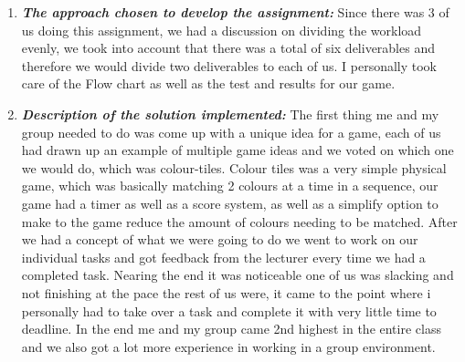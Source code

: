 \documentclass[12pt]{article}
\begin{document}
\begin{enumerate}
\item \textbf{\emph{The approach chosen to develop the assignment: }} Since there was 3 of us doing this assignment, we had a discussion on dividing the workload evenly, we took into account that there was a total of six deliverables and therefore we would divide two deliverables to each of us. I personally took care of the Flow chart as well as the test and results for our game.


\newpage

\item \textbf{\emph{Description of the solution implemented: }} The first thing me and my group needed to do was come up with a unique idea for a game, each of us had drawn up an example of multiple game ideas and we voted on which one we would do, which was colour-tiles. Colour tiles was a very simple physical game, which was basically matching 2 colours at a time in a sequence, our game had a timer as well as a score system, as well as a simplify option to make to the game reduce the amount of colours needing to be matched. After we had a concept of what we were going to do we went to work on our individual tasks and got feedback from the lecturer every time we had a completed task. Nearing the end it was noticeable one of us was slacking and not finishing at the pace the rest of us were, it came to the point where i personally had to take over a task and complete it with very little time to deadline. In the end me and my group came 2nd highest in the entire class and we also got a lot more experience in working in a group environment.
\end{enumerate}


\begin{center}
\nocite{*}

\end{center}

\end{document}
